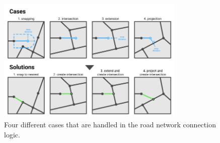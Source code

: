 \begin{figure}[H]
  \centering

  \includegraphics[width=0.8\textwidth]{figure/road_connection_cases.png}
  \caption{Four different cases that are handled in the road network connection logic.}

  \label{fig:road_connection_cases}
\end{figure}

